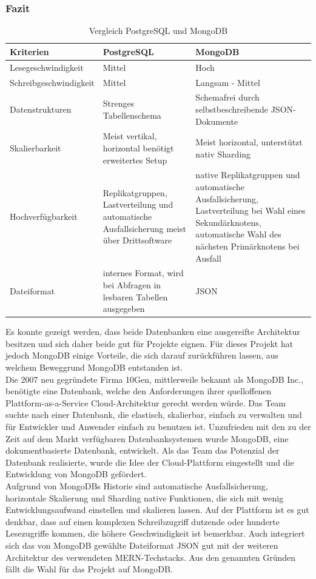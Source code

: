 \subsubsection{Fazit}
\begin{table}
\centering
\begin{tabularx}{\linewidth}{ |X|X|X| } 
    \hline
    Kriterien & PostgreSQL & MongoDB  \\ 
    \hline
    Lesegeschwindigkeit & Mittel & Hoch \\
    Schreibgeschwindigkeit & Mittel & Langsam - Mittel \\
    Datenstrukturen & Strenges Tabellenschema & Schemafrei durch selbstbeschreibende JSON-Dokumente \\
    Skalierbarkeit & Meist vertikal, horizontal benötigt erweitertes Setup & Meist horizontal, unterstützt nativ Sharding \\
    Hochverfügbarkeit & Replikatgruppen, Lastverteilung und automatische Ausfallsicherung meist über Drittsoftware & native Replikatgruppen und automatische Ausfallsicherung, Lastverteilung bei Wahl eines Sekundärknotens, automatische Wahl des nächsten Primärknotens bei Ausfall \\
    Dateiformat & internes Format, wird bei Abfragen in lesbaren Tabellen ausgegeben & JSON \\
    \hline
\end{tabularx}
\caption{Vergleich PostgreSQL und MongoDB}
\label{db:table:comparisonPostgresMongo}
\end{table}

Es konnte gezeigt werden, dass beide Datenbanken eine ausgereifte Architektur besitzen und sich daher beide gut für Projekte eignen.
Für dieses Projekt hat jedoch MongoDB einige Vorteile, die sich darauf zurückführen lassen, aus welchem Beweggrund MongoDB entstanden ist.\\ %
Die 2007 neu gegründete Firma 10Gen, mittlerweile bekannt als MongoDB Inc., benötigte eine Datenbank, welche den Anforderungen ihrer quelloffenen Plattform-as-a-Service Cloud-Architektur gerecht werden würde.
Das Team suchte nach einer Datenbank, die elastisch, skalierbar, einfach zu verwalten und für Entwickler und Anwender einfach zu benutzen ist.
Unzufrieden mit den zu der Zeit auf dem Markt verfügbaren Datenbanksystemen wurde MongoDB, eine dokumentbasierte Datenbank, entwickelt.
Als das Team das Potenzial der Datenbank realisierte, wurde die Idee der Cloud-Plattform eingestellt und die Entwicklung von MongoDB gefördert.\cite{db:mongoHistory}\\
Aufgrund von MongoDBs Historie sind automatische Ausfallsicherung, horizontale Skalierung und Sharding native Funktionen, die sich mit wenig Entwicklungsaufwand einstellen und skalieren lassen.
Auf der Plattform ist es gut denkbar, dass auf einen komplexen Schreibzugriff dutzende oder hunderte Lesezugriffe kommen, die höhere Geschwindigkeit ist bemerkbar. Auch integriert sich das von MongoDB gewählte Dateiformat JSON gut mit der weiteren Architektur des verwendeten MERN-Techstacks.
Aus den genannten Gründen fällt die Wahl für das Projekt auf MongoDB.


